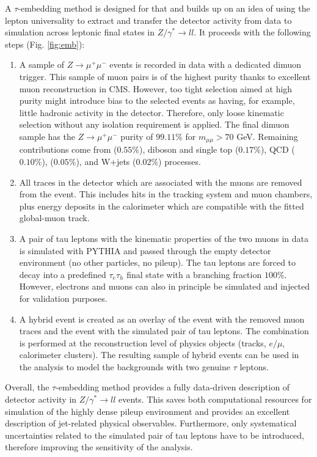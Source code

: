 A $\tau$-embedding method is designed for that and builds up on an idea of using the lepton universality to extract and transfer the detector activity from data to simulation across leptonic final states in $Z/\gamma^* \to ll$. It proceeds with the following steps (Fig. \ref{fig:emb}):

\begin{enumerate}
    \item A sample of $Z\to \mu^+\mu^-$ events is recorded in data with a dedicated dimuon trigger. This sample of muon pairs is of the highest purity thanks to excellent muon reconstruction in CMS. However, too tight selection aimed at high purity might introduce bias to the selected events as having, for example, little hadronic activity in the detector. Therefore, only loose kinematic selection without any isolation requirement is applied. The final dimuon sample has the $Z\to \mu^+\mu^-$ purity of $99.11\%$ for $m_{\mu\mu} > 70$ GeV. Remaining contributions come from \ttbar ($0.55\%$), diboson and single top ($0.17\%$), QCD ($0.10\%$), \ztt ($0.05\%$), and W+jets ($0.02\%$) processes. 
    
    \item All traces in the detector which are associated with the muons are removed from the event. This includes hits in the tracking system and muon chambers, plus energy deposits in the calorimeter which are compatible with the fitted global-muon track. 
    
    \item A pair of tau leptons with the kinematic properties of the two muons in data is simulated with PYTHIA and passed through the empty detector environment (no other particles, no pileup). The tau leptons are forced to decay into a predefined $\tau_e\tau_h$ final state with a branching fraction $100\%$. However, electrons and muons can also in principle be simulated and injected for validation purposes. 
    
    \item A hybrid event is created as an overlay of the event with the removed muon traces and the event with the simulated pair of tau leptons. The combination is performed at the reconstruction level of physics objects (tracks, $e/\mu$, calorimeter clusters). The resulting sample of hybrid events can be used in the analysis to model the backgrounds with two genuine $\tau$ leptons.

\end{enumerate}
 
 Overall, the $\tau$-embedding method provides a fully data-driven description of detector activity in $Z/\gamma^* \to ll$ events. This saves both computational resources for simulation of the highly dense pileup environment and provides an excellent description of jet-related physical observables. Furthermore, only systematical uncertainties related to the simulated pair of tau leptons have to be introduced, therefore improving the sensitivity of the analysis. 

